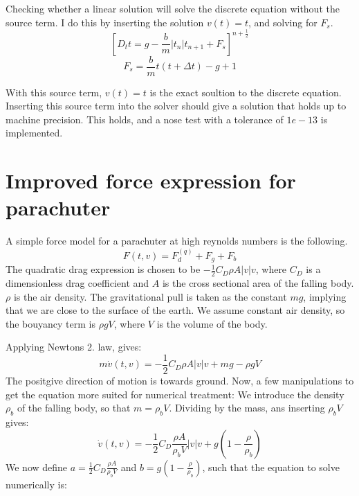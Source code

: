 \documentclass[a4paper, 10pt]{article}
\begin{document}
Checking whether a linear solution will solve the discrete equation without the source term. I do this by inserting the solution $v(t) = t$, and solving for $F_s$.  
\begin{equation}
	\left[D_t t = g - \frac{b}{m} |t_n|t_{n+1} + F_s\right]^{n+\frac{1}{2}}
\end{equation}
\begin{equation}
	F_s = \frac{b}{m} t(t+\Delta t) - g + 1 
\end{equation}

With this source term, $v(t) = t$ is the exact soultion to the discrete equation. Inserting this source term into the solver should give a solution that holds up to machine precision. This holds, and a nose test with a tolerance of $1e-13$ is implemented.

\section{Improved force expression for parachuter}
A simple force model for a parachuter at high reynolds numbers is the following.
\begin{equation}
	F(t, v) = F_d^{(q)} + F_g + F_b
\end{equation}
The quadratic drag expression is chosen to be $-\frac{1}{2}C_D \rho A |v|v$, where $C_D$ is a dimensionless drag coefficient and $A$ is the cross sectional area of the falling body. $\rho$ is the air density. The gravitational pull is taken as the constant $mg$, implying that we are close to the surface of the earth. We assume constant air density, so the bouyancy term is $\rho g V$, where $V$ is the volume of the body. 

Applying Newtons 2. law, gives:
\begin{equation}
	m\dot{v}(t, v) = -\frac{1}{2}C_D \rho A |v|v + mg - \rho g V
\end{equation}
The positgive direction of motion is towards ground.
Now, a few manipulations to get the equation more suited for numerical treatment:
We introduce the density $\rho_b$ of the falling body, so that $m = \rho_b V$. Dividing by the mass, ans inserting $\rho_b V$ gives:
\begin{equation}
	\dot{v}(t, v) = -\frac{1}{2} C_D \frac{\rho A}{\rho_b V}|v|v + g\left( 1- \frac{\rho}{\rho_b} \right) 
\end{equation}
We now define 
$a = \frac{1}{2} C_D \frac{\rho A}{\rho_b V}$ 
and 
$b = g\left( 1- \frac{\rho}{\rho_b}\right)$, 
such that the equation to solve numerically is:
\end{document}
